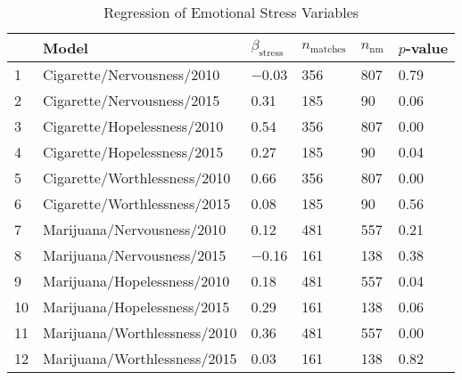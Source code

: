 \begin{table}[ht]
\centering
\begin{tabularx}{\columnwidth}{XlXXXX}
  \hline
 & Model & $\beta_{\text{stress}}$ & $n_{\text{matches}}$ & $n_{\text{nm}}$ & $p$-value \\ 
  \hline
1 & Cigarette/Nervousness/2010 & $-$0.03 & 356 & 807 & 0.79 \\ 
  2 & Cigarette/Nervousness/2015 & 0.31 & 185 &  90 & 0.06 \\ 
  3 & Cigarette/Hopelessness/2010 & 0.54 & 356 & 807 & 0.00 \\ 
  4 & Cigarette/Hopelessness/2015 & 0.27 & 185 &  90 & 0.04 \\ 
  5 & Cigarette/Worthlessness/2010 & 0.66 & 356 & 807 & 0.00 \\ 
  6 & Cigarette/Worthlessness/2015 & 0.08 & 185 &  90 & 0.56 \\ 
  7 & Marijuana/Nervousness/2010 & 0.12 & 481 & 557 & 0.21 \\ 
  8 & Marijuana/Nervousness/2015 & $-$0.16 & 161 & 138 & 0.38 \\ 
  9 & Marijuana/Hopelessness/2010 & 0.18 & 481 & 557 & 0.04 \\ 
  10 & Marijuana/Hopelessness/2015 & 0.29 & 161 & 138 & 0.06 \\ 
  11 & Marijuana/Worthlessness/2010 & 0.36 & 481 & 557 & 0.00 \\ 
  12 & Marijuana/Worthlessness/2015 & 0.03 & 161 & 138 & 0.82 \\ 
   \hline
\end{tabularx}
\caption{Regression of Emotional Stress Variables}
\end{table}
